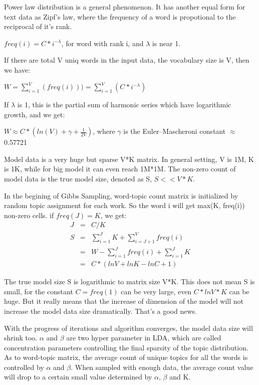 Power law distribution is a general phenomenon. It has another equal form for text data as Zipf's law, where the frequency of a word is propotional to the reciprocal of it's rank.

$freq(i) = C*i^{-\lambda}$, for word with rank i, and $\lambda$ is near 1.

If there are total V uniq words in the input data, the vocabulary size is V, then we have:  

$W = \sum_{i=1}^{V}(freq(i))) = \sum_{i=1}^{V}(C*i^{-\lambda})$

If $\lambda$ is 1, this is the partial sum of harmonic series which have logarithmic growth, and we get:

$W \approx C*(ln(V) + \gamma + \frac{1}{2V})$, where $\gamma$ is the Euler–Mascheroni constant $\approx$ 0.57721

Model data is a very huge but sparse V*K matrix. In general setting, V is 1M, K is 1K, while for big model it can even reach 1M*1M. The non-zero count of model data is the true model size, denoted as S, $S << V*K$. 

In the begining of Gibbs Sampling, word-topic count matrix is initialized by random topic assignment for each work. So the word i will get max(K, freq(i)) non-zero cells. 
if $freq(J) = K$, we get:
\begin{eqnarray*}
J &=& C/K \\
S &=& \sum_{i=1}^{J}K + \sum_{i=J+1}^{V}freq(i)  \\
  &=& W - \sum_{i=1}^{J}freq(i) + \sum_{i=1}^{J}K  \\
  &=& C*(lnV + lnK- lnC +1)
\end{eqnarray*}

The true model size S is logarithmic to matrix size V*K. This does not mean S is small, for the constant $C = freq(1)$ can be very large, even $C*lnV*K$ can be huge. But it really means that the increase of dimension of the model will not increase the model data size dramatically. That's a good news.

With the progress of iterations and algorithm converges, the model data size will shrink too. $\alpha$ and $\beta$ are two hyper parameter in LDA, which are called concentration parameters controlling the final sparsity of the topic distribution. As to word-topic matrix, the average count of unique topics for all the words is controlled by $\alpha$ and $\beta$. When sampled with enough data, the average count value will drop to a certain small value determined by $\alpha$, $\beta$ and K.

